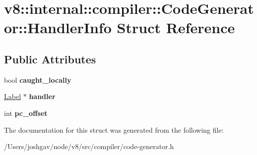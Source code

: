 \hypertarget{structv8_1_1internal_1_1compiler_1_1_code_generator_1_1_handler_info}{}\section{v8\+:\+:internal\+:\+:compiler\+:\+:Code\+Generator\+:\+:Handler\+Info Struct Reference}
\label{structv8_1_1internal_1_1compiler_1_1_code_generator_1_1_handler_info}
\subsection*{Public Attributes}
\begin{DoxyCompactItemize}
\item 
bool {\bfseries caught\+\_\+locally}\hypertarget{structv8_1_1internal_1_1compiler_1_1_code_generator_1_1_handler_info_a0172f36f65fede6472b6c9125d05e461}{}\label{structv8_1_1internal_1_1compiler_1_1_code_generator_1_1_handler_info_a0172f36f65fede6472b6c9125d05e461}

\item 
\hyperlink{classv8_1_1internal_1_1_label}{Label} $\ast$ {\bfseries handler}\hypertarget{structv8_1_1internal_1_1compiler_1_1_code_generator_1_1_handler_info_a8cbbe84c6dd2a5fccee68b16ea83f468}{}\label{structv8_1_1internal_1_1compiler_1_1_code_generator_1_1_handler_info_a8cbbe84c6dd2a5fccee68b16ea83f468}

\item 
int {\bfseries pc\+\_\+offset}\hypertarget{structv8_1_1internal_1_1compiler_1_1_code_generator_1_1_handler_info_a4cae79946707e1bc23d7426cb090458a}{}\label{structv8_1_1internal_1_1compiler_1_1_code_generator_1_1_handler_info_a4cae79946707e1bc23d7426cb090458a}

\end{DoxyCompactItemize}


The documentation for this struct was generated from the following file\+:\begin{DoxyCompactItemize}
\item 
/\+Users/joshgav/node/v8/src/compiler/code-\/generator.\+h\end{DoxyCompactItemize}
